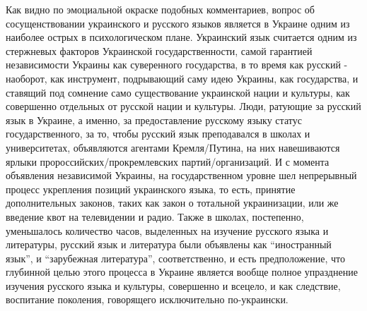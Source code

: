 Как видно по эмоциальной окраске подобных комментариев, вопрос об
сосущенствовании украинского и русского языков является в Украине одним из
наиболее острых в психологическом плане. Украинский язык считается одним из
стержневых факторов Украинской государственности, самой гарантией независимости
Украины как суверенного государства, в то время как русский - наоборот, как
инструмент, подрывающий саму идею Украины, как государства, и ставящий под
сомнение само существование украинской нации и культуры, как совершенно
отдельных от русской нации и культуры. Люди, ратующие за русский язык в
Украине, а именно, за предоставление русскому языку статус государственного, за
то, чтобы русский язык преподавался в школах и университетах, объявляются
агентами Кремля/Путина, на них навешиваются ярлыки пророссийских/прокремлевских
партий/организаций. И с момента объявления независимой Украины, на
государственном уровне шел непрерывный процесс укрепления позиций украинского
языка, то есть, принятие дополнительных законов, таких как закон о тотальной
украинизации, или же введение квот на телевидении и радио. Также в школах,
постепенно, уменьшалось количество часов, выделенных на изучение русского языка
и литературы, русский язык и литература были объявлены как \enquote{иностранный
язык}, и \enquote{зарубежная литература}, соответственно, и есть предположение, что глубинной
целью этого процесса в Украине является вообще полное упразднение изучения
русского языка и культуры, совершенно и всецело, и как следствие, воспитание
поколения, говорящего исключительно по-украински.

